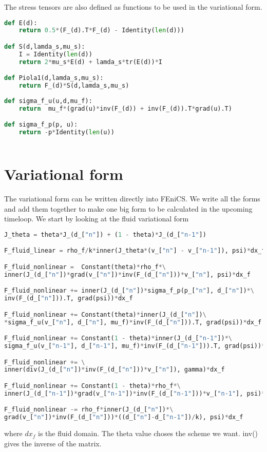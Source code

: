 The stress tensors are also defined as functions to be used in the variational form.

\begin{lstlisting}[language=Python, basicstyle=\small]
def E(d):
	return 0.5*(F_(d).T*F_(d) - Identity(len(d)))

def S(d,lamda_s,mu_s):
    I = Identity(len(d))
    return 2*mu_s*E(d) + lamda_s*tr(E(d))*I

def Piola1(d,lamda_s,mu_s):
	return F_(d)*S(d,lamda_s,mu_s)
	
def sigma_f_u(u,d,mu_f):
    return  mu_f*(grad(u)*inv(F_(d)) + inv(F_(d)).T*grad(u).T)

def sigma_f_p(p, u):
    return -p*Identity(len(u))
    
\end{lstlisting}

\section{Variational form}

The variational form can be written directly into FEniCS. We write all the forms and add them together to make one big form to be calculated in the upcoming timeloop. We start by looking at the fluid variational form
\begin{lstlisting}[language=Python, basicstyle=\small]
J_theta = theta*J_(d_["n"]) + (1 - theta)*J_(d_["n-1"])

F_fluid_linear = rho_f/k*inner(J_theta*(v_["n"] - v_["n-1"]), psi)*dx_f

F_fluid_nonlinear =  Constant(theta)*rho_f*\
inner(J_(d_["n"])*grad(v_["n"])*inv(F_(d_["n"]))*v_["n"], psi)*dx_f

F_fluid_nonlinear += inner(J_(d_["n"])*sigma_f_p(p_["n"], d_["n"])*\
inv(F_(d_["n"])).T, grad(psi))*dx_f

F_fluid_nonlinear += Constant(theta)*inner(J_(d_["n"])\
*sigma_f_u(v_["n"], d_["n"], mu_f)*inv(F_(d_["n"])).T, grad(psi))*dx_f

F_fluid_nonlinear += Constant(1 - theta)*inner(J_(d_["n-1"])*\
sigma_f_u(v_["n-1"], d_["n-1"], mu_f)*inv(F_(d_["n-1"])).T, grad(psi))*dx_f

F_fluid_nonlinear += \
inner(div(J_(d_["n"])*inv(F_(d_["n"]))*v_["n"]), gamma)*dx_f

F_fluid_nonlinear += Constant(1 - theta)*rho_f*\
inner(J_(d_["n-1"])*grad(v_["n-1"])*inv(F_(d_["n-1"]))*v_["n-1"], psi)*dx_f

F_fluid_nonlinear -= rho_f*inner(J_(d_["n"])*\
grad(v_["n"])*inv(F_(d_["n"]))*((d_["n"]-d_["n-1"])/k), psi)*dx_f
\end{lstlisting}
where $dx_f$ is the fluid domain. The theta value choses the scheme we want. inv() gives the inverse of the matrix. 


